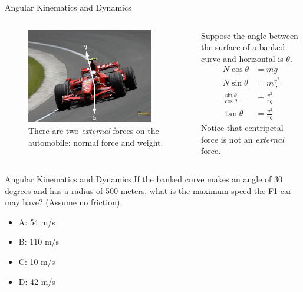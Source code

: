 \documentclass{beamer}
\begin{document}
\begin{frame}{Angular Kinematics and Dynamics}
\begin{columns}[T]
\begin{column}{0.5\textwidth}
\begin{figure}
\centering
\includegraphics[width=0.9\textwidth]{figures/ferari.pdf}
\caption{\label{fig:ferari} There are two \alert{\textit{external}} forces on the automobile: normal force and weight.}
\end{figure}
\end{column}
\begin{column}{0.5\textwidth}
\small
Suppose the angle between the surface of a banked curve and horizontal is $\theta$.
\begin{align}
N\cos\theta &= mg \\
N\sin\theta &= m\frac{v^2}{r} \\
\frac{\sin\theta}{\cos\theta} &= \frac{v^2}{rg} \\
\tan\theta &= \frac{v^2}{rg}
\end{align}
Notice that centripetal force is not an \textit{external} force.
\end{column}
\end{columns}
\end{frame}

\begin{frame}{Angular Kinematics and Dynamics}
If the banked curve makes an angle of 30 degrees and has a radius of 500 meters, what is the maximum speed the F1 car may have? (Assume no friction).
\begin{itemize}
\item A: 54 m/s
\item B: 110 m/s
\item C: 10 m/s
\item D: 42 m/s
\end{itemize}
\end{frame}
\end{document}
